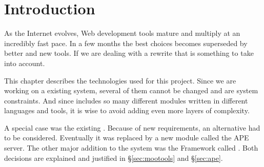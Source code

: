 \section{Introduction} %
\label{sec:intro2}

As the Internet evolves, Web development tools mature and multiply at an incredibly fast pace. In a few months the best choices becomes superseded by better and new tools. If we are dealing with a rewrite that is something to take into account.

This chapter describes the technologies used for this project. Since we are working on a existing system, several of them cannot be changed and are system constraints. And since  includes so many different modules written in different languages and tools, it is wise to avoid adding even more layers of complexity.

A special case was the existing . Because of new requirements, an alternative had to be considered. Eventually it was replaced by a new module called the \ac{APE} server. The other major addition to the system was the  Framework called . Both decisions are explained and justified in \S\ref{sec:mootools} and  \S\ref{sec:ape}.

